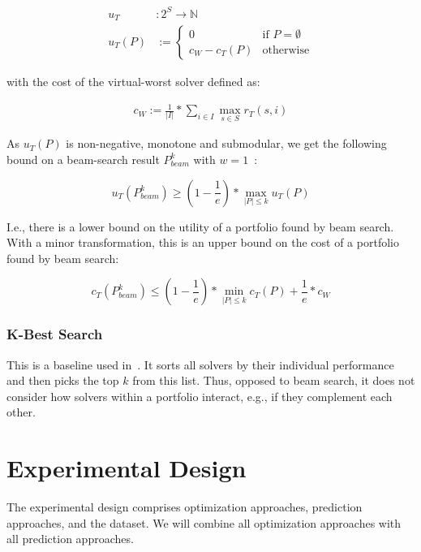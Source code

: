 \documentclass[conference]{IEEEtran}
\begin{document}
\begin{align*}
	u_{T} &: 2^S \rightarrow \mathbb{N}\\
	u_{T}(P) &:= \begin{cases}
		0 & \text{if }P=\emptyset\\
		c_W - c_{T}(P) & \text{otherwise}
	\end{cases} \tag*{Portfolio Utility}
\end{align*}

with the cost of the virtual-worst solver defined as:

\begin{align*}
	c_W := \frac{1}{|I|} * \sum_{i \in I}{\max_{s \in S}{r_T(s,i)}} \tag*{Virtual Worst Solver}
\end{align*}

As $u_{T}(P)$ is non-negative, monotone and submodular, we get the following bound on a beam-search result $P_{beam}^k$ with $w=1$~\cite{nemhauser1978analysis, krause2014submodular}:

\begin{equation}
	u_{T}(P_{beam}^k) \geq (1 - \frac{1}{e}) * \max_{|P| \leq k}{u_{T}(P)}
\end{equation}

I.e., there is a lower bound on the utility of a portfolio found by beam search.
With a minor transformation, this is an upper bound on the cost of a portfolio found by beam search:

\begin{equation}
	c_{T}(P_{beam}^k) \leq (1 - \frac{1}{e}) * \min_{|P| \leq k}{c_{T}(P)} + \frac{1}{e} * c_W
	\label{eq:upper-bound}
\end{equation}

\subsubsection{K-Best Search}

This is a baseline used in~\cite{nof2020real}.
It sorts all solvers by their individual performance and then picks the top $k$ from this list.
Thus, opposed to beam search, it does not consider how solvers within a portfolio interact, e.g., if they complement each other.

\section{Experimental Design}
\label{sec:experimental-design}

The experimental design comprises optimization approaches, prediction approaches, and the dataset.
We will combine all optimization approaches with all prediction approaches.
\end{document}
